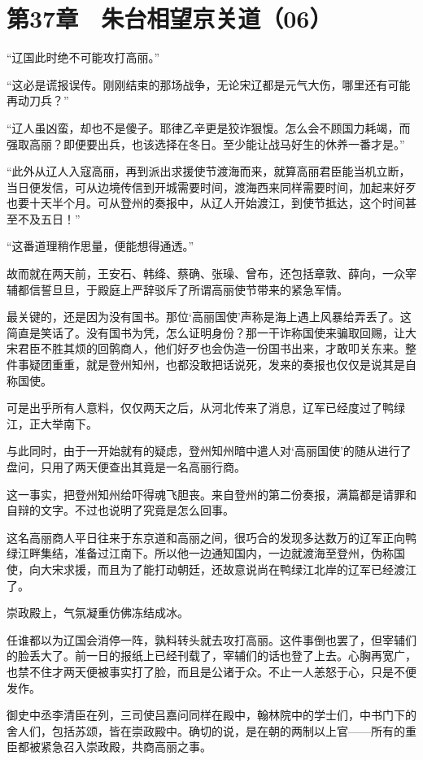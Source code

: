 \section{第37章　朱台相望京关道（06）}

“辽国此时绝不可能攻打高丽。”

“这必是谎报误传。刚刚结束的那场战争，无论宋辽都是元气大伤，哪里还有可能再动刀兵？”

“辽人虽凶蛮，却也不是傻子。耶律乙辛更是狡诈狠愎。怎么会不顾国力耗竭，而强取高丽？即便要出兵，也该选择在冬日。至少能让战马好生的休养一番才是。”

“此外从辽人入寇高丽，再到派出求援使节渡海而来，就算高丽君臣能当机立断，当日便发信，可从边境传信到开城需要时间，渡海西来同样需要时间，加起来好歹也要十天半个月。可从登州的奏报中，从辽人开始渡江，到使节抵达，这个时间甚至不及五日！”

“这番道理稍作思量，便能想得通透。”

故而就在两天前，王安石、韩绛、蔡确、张璪、曾布，还包括章敦、薛向，一众宰辅都信誓旦旦，于殿庭上严辞驳斥了所谓高丽使节带来的紧急军情。

最关键的，还是因为没有国书。那位‘高丽国使’声称是海上遇上风暴给弄丢了。这简直是笑话了。没有国书为凭，怎么证明身份？那一干诈称国使来骗取回赐，让大宋君臣不胜其烦的回鹘商人，他们好歹也会伪造一份国书出来，才敢叩关东来。整件事疑团重重，就是登州知州，也都没敢把话说死，发来的奏报也仅仅是说其是自称国使。

可是出乎所有人意料，仅仅两天之后，从河北传来了消息，辽军已经度过了鸭绿江，正大举南下。

与此同时，由于一开始就有的疑虑，登州知州暗中遣人对‘高丽国使’的随从进行了盘问，只用了两天便查出其竟是一名高丽行商。

这一事实，把登州知州给吓得魂飞胆丧。来自登州的第二份奏报，满篇都是请罪和自辩的文字。不过也说明了究竟是怎么回事。

这名高丽商人平日往来于东京道和高丽之间，很巧合的发现多达数万的辽军正向鸭绿江畔集结，准备过江南下。所以他一边通知国内，一边就渡海至登州，伪称国使，向大宋求援，而且为了能打动朝廷，还故意说尚在鸭绿江北岸的辽军已经渡江了。

崇政殿上，气氛凝重仿佛冻结成冰。

任谁都以为辽国会消停一阵，孰料转头就去攻打高丽。这件事倒也罢了，但宰辅们的脸丢大了。前一日的报纸上已经刊载了，宰辅们的话也登了上去。心胸再宽广，也禁不住才两天便被事实打了脸，而且是公诸于众。不止一人恙怒于心，只是不便发作。

御史中丞李清臣在列，三司使吕嘉问同样在殿中，翰林院中的学士们，中书门下的舍人们，包括苏颂，皆在崇政殿中。确切的说，是在朝的两制以上官——所有的重臣都被紧急召入崇政殿，共商高丽之事。

